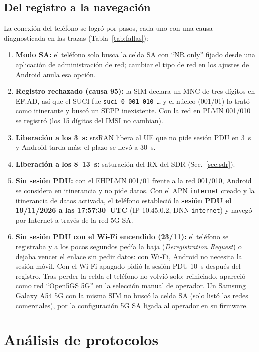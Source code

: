\documentclass[conference]{IEEEtran}
\begin{document}
\subsection{Del registro a la navegación}
La conexión del teléfono se logró por pasos, cada uno con una causa diagnosticada en las trazas (Tabla~\ref{tab:fallas}):
\begin{enumerate}
  \item \textbf{Modo SA:} el teléfono solo busca la celda SA con ``NR only'' fijado desde una aplicación de administración de red; cambiar el tipo de red en los ajustes de Android anula esa opción.
  \item \textbf{Registro rechazado (causa 95):} la SIM declara un MNC de tres dígitos en EF.AD, así que el SUCI fue \texttt{suci-0-001-010-\ldots} y el núcleo (001/01) lo trató como itinerante y buscó un SEPP inexistente. Con la red en PLMN 001/010 se registró (los 15 dígitos del IMSI no cambian).
  \item \textbf{Liberación a los 3~s:} srsRAN libera al UE que no pide sesión PDU en 3~s y Android tarda más; el plazo se llevó a 30~s.
  \item \textbf{Liberación a los 8--13~s:} saturación del RX del SDR (Sec.~\ref{sec:sdr}).
  \item \textbf{Sin sesión PDU:} con el EHPLMN 001/01 frente a la red 001/010, Android se considera en itinerancia y no pide datos. Con el APN \texttt{internet} creado y la itinerancia de datos activada, el teléfono estableció la \textbf{sesión PDU el 19/11/2026 a las 17:57:30~UTC} (IP 10.45.0.2, DNN \texttt{internet}) y navegó por Internet a través de la red 5G SA.
  \item \textbf{Sin sesión PDU con el Wi-Fi encendido (23/11):} el teléfono se registraba y a los pocos segundos pedía la baja (\textit{Deregistration Request}) o dejaba vencer el enlace sin pedir datos: con Wi-Fi, Android no necesita la sesión móvil. Con el Wi-Fi apagado pidió la sesión PDU 10~s después del registro. Tras perder la celda el teléfono no volvió solo; reiniciado, apareció como red ``Open5GS 5G'' en la selección manual de operador. Un Samsung Galaxy A54 5G con la misma SIM no buscó la celda SA (solo listó las redes comerciales), por la configuración 5G SA ligada al operador en su firmware.
\end{enumerate}

\section{Análisis de protocolos}
\label{sec:proto}
\end{document}
